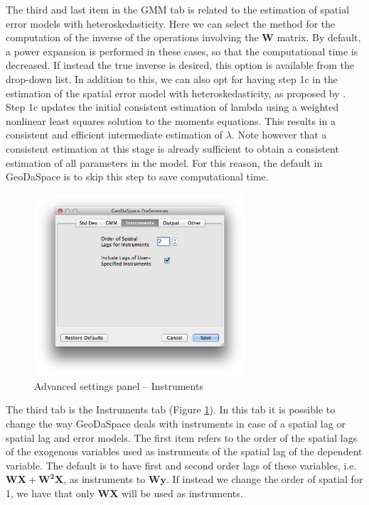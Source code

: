 \documentclass{article}
\begin{document}
The third and last item in the GMM tab is related to the estimation of spatial error models with heteroskedasticity. Here we can select the method for the computation of the inverse of the operations involving the $\mathbf{W}$ matrix. By default, a power expansion is performed in these cases, so that the computational time is decreased. If instead the true inverse is desired, this option is available from the drop-down list. In addition to this, we can also opt for having step 1c in the estimation of the spatial error model with heteroskedasticity, as proposed by \citet{Arraiz10}. Step 1c updates the initial consistent estimation of lambda using a weighted nonlinear least squares solution to the moments equations. This results in a consistent and efficient intermediate estimation of $\lambda$. Note however that a consistent estimation at this stage is already sufficient to obtain a consistent estimation of all parameters in the model. For this reason, the default in GeoDaSpace is to skip this step to save computational time.
\FloatBarrier

\begin{figure}[htb]
\centering
\caption{Advanced settings panel -- Instruments}
\label{f:adv_inst}
\includegraphics[width=0.7\textwidth]{adv_inst.png}
\end{figure}

The third tab is the Instruments tab (Figure \ref{f:adv_inst}). In this tab it is possible to change the way GeoDaSpace deals with instruments in case of a spatial lag or spatial lag and error models. The first item refers to the order of the spatial lags of the exogenous variables used as instruments of the spatial lag of the dependent variable. The default is to have first and second order lags of these variables, i.e. $\mathbf{WX} + \mathbf{W^2X}$, as instruments to $\mathbf{Wy}$. If instead we change the order of spatial for 1, we have that only $\mathbf{WX}$ will be used as instruments. 
\end{document}
